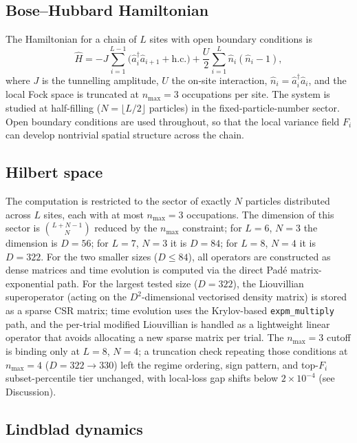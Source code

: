 \documentclass[aps,pra,reprint,amsmath,amssymb,longbibliography,floatfix]{revtex4-2}
\newcommand{\Fi}{F_i}
\newcommand{\nop}{\hat{n}}
\newcommand{\adag}{\hat{a}^\dagger}
\newcommand{\aop}{\hat{a}}
\begin{document}
\subsection{Bose--Hubbard Hamiltonian}

The Hamiltonian for a chain of $L$ sites with open boundary conditions is
\begin{equation}
\label{eq:ham}
\hat{H} = -J\sum_{i=1}^{L-1}\bigl(\adag_i\aop_{i+1} + \mathrm{h.c.}\bigr)
         + \frac{U}{2}\sum_{i=1}^{L}\nop_i(\nop_i - 1),
\end{equation}
where $J$ is the tunnelling amplitude, $U$ the on-site interaction,
$\nop_i = \adag_i\aop_i$, and the local Fock space is truncated at
$n_{\max}=3$ occupations per site.
The system is studied at half-filling ($N=\lfloor L/2\rfloor$ particles) in
the fixed-particle-number sector.
Open boundary conditions are used throughout, so that the local variance
field $\Fi$ can develop nontrivial spatial structure across the chain.

\subsection{Hilbert space}

The computation is restricted to the sector of exactly $N$ particles
distributed across $L$ sites, each with at most $n_{\max}=3$ occupations.
The dimension of this sector is $\binom{L+N-1}{N}$ reduced by the
$n_{\max}$ constraint; for $L=6$, $N=3$ the dimension is $D=56$; for
$L=7$, $N=3$ it is $D=84$; for $L=8$, $N=4$ it is $D=322$.
For the two smaller sizes ($D\leq84$), all operators are constructed as
dense matrices and time evolution is computed via the direct Pad\'{e}
matrix-exponential path.
For the largest tested size ($D=322$), the Liouvillian superoperator
(acting on the $D^2$-dimensional vectorised density matrix) is stored as
a sparse CSR matrix; time evolution uses the Krylov-based
\texttt{expm\_multiply} path, and the per-trial modified Liouvillian
is handled as a lightweight linear operator that avoids allocating a
new sparse matrix per trial.
The $n_{\max}=3$ cutoff is binding only at $L=8$, $N=4$; a truncation
check repeating those conditions at $n_{\max}=4$ ($D=322\to330$) left
the regime ordering, sign pattern, and top-$\Fi$ subset-percentile tier
unchanged, with local-loss gap shifts below $2\times10^{-4}$
(see Discussion).

\subsection{Lindblad dynamics}
\end{document}
